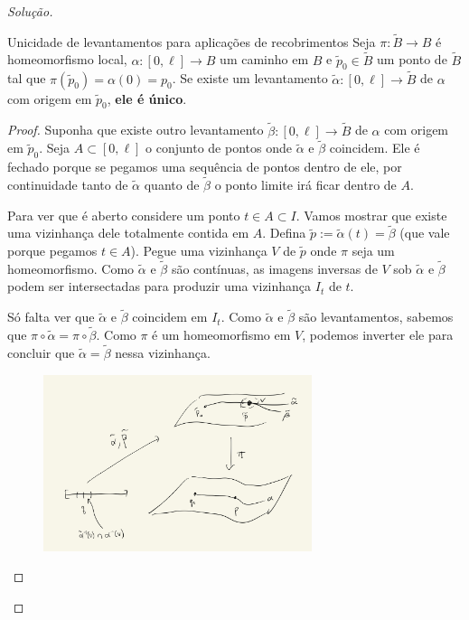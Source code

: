 \begin{proof}[Solução]
\begin{thing7}{Unicidade de levantamentos para aplicações de recobrimentos}\leavevmode
	Seja \(\pi:\tilde{B}\to B\) é homeomorfismo local, \(\alpha:[0,\ell] \to B\) um caminho em \(B\) e \(\tilde{p}_0 \in \tilde{B}\) um ponto de \(\tilde{B}\) tal que \(\pi(\tilde{p}_0)=\alpha(0)=p_0\). Se existe um levantamento \(\tilde{\alpha}:[0,\ell] \to \tilde{B}\) de \(\alpha\) com origem em \(\tilde{p}_0\), \textbf{ele é único}.
\end{thing7}

\begin{proof}\leavevmode
	Suponha que existe outro levantamento \(\tilde{\beta}:[0,\ell] \to \tilde{B}\) de \(\alpha\) com origem em \(\tilde{p}_0\). Seja \(A \subset[0,\ell]\) o conjunto de pontos onde \(\tilde{\alpha}\) e \(\tilde{\beta}\) coincidem. Ele é fechado porque se pegamos uma sequência de pontos dentro de ele, por continuidade tanto de \(\tilde{\alpha}\) quanto de \(\tilde{\beta}\) o ponto limite irá ficar dentro de \(A\).

	Para ver que é aberto considere um ponto \(t \in A \subset I\). Vamos mostrar que existe uma vizinhança dele totalmente contida em \(A\). Defina \(\tilde{p}:=\tilde{\alpha}(t)=\tilde{\beta}\) (que vale porque pegamos \(t \in A\)). Pegue uma vizinhança \(V\) de \(\tilde{p}\) onde \(\pi\) seja um homeomorfismo. Como \(\tilde{\alpha}\) e \(\tilde{\beta}\) são contínuas, as imagens inversas de \(V\) sob \(\tilde{\alpha}\) e \(\tilde{\beta}\) podem ser intersectadas para produzir uma vizinhança \(I_t\) de \(t\).

	Só falta ver que \(\tilde{\alpha}\) e \(\tilde{\beta}\) coincidem em \(I_t\). Como \(\tilde{\alpha}\) e \(\tilde{\beta}\) são levantamentos, sabemos que \(\pi \circ \tilde{\alpha}=\pi \circ \tilde{\beta}\). Como \(\pi\) é um homeomorfismo em \(V\), podemos inverter ele para concluir que \(\tilde{\alpha}=\tilde{\beta}\) nessa vizinhança.

	\begin{figure}[H]
		\centering
		\includegraphics[width=0.7\textwidth]{fig13}
		\caption*{}
	\end{figure}
\end{proof}


\end{proof}
